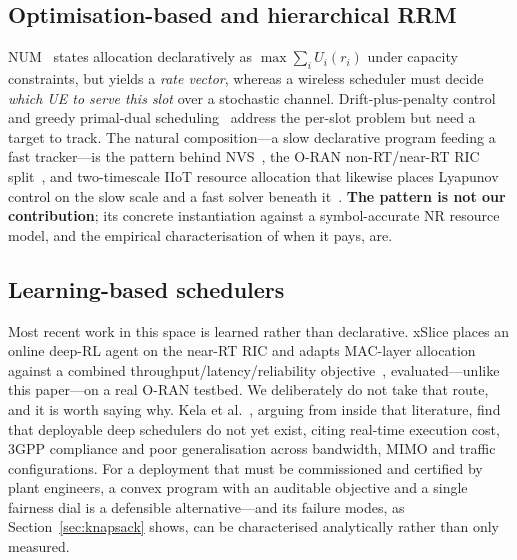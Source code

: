 \documentclass[conference]{IEEEtran}
\begin{document}
\subsection{Optimisation-based and hierarchical RRM}
NUM~\cite{kelly1998} states allocation declaratively as
$\max \sum_i U_i(r_i)$ under capacity constraints, but yields a
\emph{rate vector}, whereas a wireless scheduler must decide \emph{which UE
to serve this slot} over a stochastic channel. Drift-plus-penalty
control~\cite{neely2010} and greedy primal-dual
scheduling~\cite{stolyar2005} address the per-slot problem but need a
target to track. The natural composition---a slow declarative program
feeding a fast tracker---is the pattern behind NVS~\cite{kokku2012}, the
O-RAN non-RT/near-RT RIC split~\cite{oran}, and two-timescale IIoT resource
allocation that likewise places Lyapunov control on the slow scale and a
fast solver beneath it~\cite{he2022twotimescale}. \textbf{The pattern is
not our contribution}; its concrete instantiation against a symbol-accurate
NR resource model, and the empirical characterisation of when it pays, are.

\subsection{Learning-based schedulers}
Most recent work in this space is learned rather than declarative. xSlice
places an online deep-RL agent on the near-RT RIC and adapts MAC-layer
allocation against a combined throughput/latency/reliability
objective~\cite{yan2026xslice}, evaluated---unlike this paper---on a real
O-RAN testbed. We deliberately do not take that route, and it is worth saying why. Kela et
al.~\cite{kela2024deep}, arguing from inside that literature, find that
deployable deep schedulers do not yet exist, citing real-time execution
cost, 3GPP compliance and poor generalisation across bandwidth, MIMO and
traffic configurations. For a deployment that must be commissioned and
certified by plant engineers, a convex program with an auditable objective
and a single fairness dial is a defensible alternative---and its failure
modes, as Section~\ref{sec:knapsack} shows, can be characterised
analytically rather than only measured.
\end{document}
